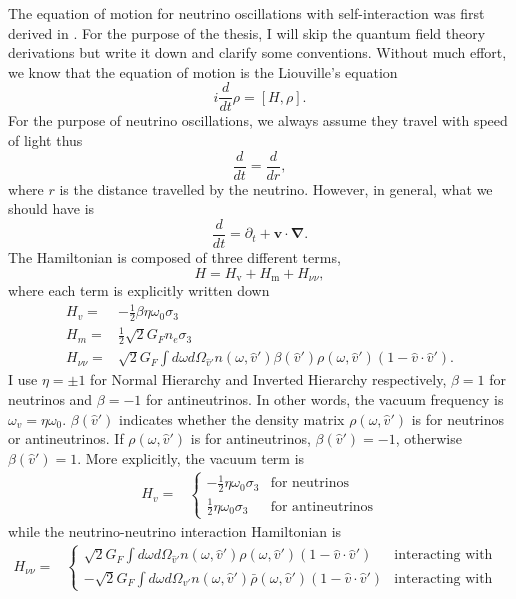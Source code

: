 The equation of motion for neutrino oscillations with self-interaction was first derived in \cite{Sigl1993}. For the purpose of the thesis, I will skip the quantum field theory derivations but write it down and clarify some conventions. Without much effort, we know that the equation of motion is the Liouville's equation
\begin{equation}
   i \frac{d}{dt}\rho = [H,\rho].
\end{equation}
For the purpose of neutrino oscillations, we always assume they travel with speed of light thus
\begin{equation}
   \frac{d}{dt} = \frac{d}{dr},
\end{equation}
where $r$ is the distance travelled by the neutrino. However, in general, what we should have is
\begin{equation}
   \frac{d}{dt} = \partial_t + \mathbf v\cdot \boldsymbol{\nabla}.
\end{equation}
The Hamiltonian is composed of three different terms,
\begin{equation}
   H = H_{\mathrm v} + H_{\mathrm m} + H_{\nu\nu},
\end{equation}
where each term is explicitly written down
\begin{align}
   H_v =& -\frac{1}{2}\beta\eta \omega_0 \sigma_3\\
   H_m =& \frac{1}{2} \sqrt{2}G_F n_e \sigma_3 \\
   H_{\nu\nu} =& \sqrt{2}G_F \int d\omega d\Omega_{\hat v'} n(\omega,\hat v')\beta(\hat v')\rho(\omega,\hat v') (1-\hat v \cdot \hat v').
\end{align}
I use $\eta=\pm 1$ for Normal Hierarchy and Inverted Hierarchy respectively, $\beta=1$ for neutrinos and $\beta=-1$ for antineutrinos. In other words, the vacuum frequency is $\omega_v = \eta \omega_0$. $\beta(\hat v')$ indicates whether the density matrix $\rho(\omega,\hat v')$ is for neutrinos or antineutrinos. If $\rho(\omega,\hat v')$ is for antineutrinos, $\beta(\hat v')=-1$, otherwise $\beta(\hat v')=1$. More explicitly, the vacuum term is
\begin{align*}
   H_v =& \begin{cases}
   -\frac{1}{2}\eta \omega_0 \sigma_3 & \text{for neutrinos}\\
   \frac{1}{2}\eta \omega_0 \sigma_3 & \text{for antineutrinos}
   \end{cases}
\end{align*}
while the neutrino-neutrino interaction Hamiltonian is
\begin{align*}
   H_{\nu\nu} =& \begin{cases}
   \sqrt{2}G_F \int d\omega d\Omega_{\hat v'} n(\omega,\hat v')\rho(\omega,\hat v') (1-\hat v \cdot \hat v') & \text{interacting with neutrinos} \\
   - \sqrt{2}G_F \int d\omega d\Omega_{\hat v'} n(\omega,\hat v')\bar\rho(\omega,\hat v') (1-\hat v \cdot \hat v') &  \text{interacting with antineutrinos}
   \end{cases}
\end{align*}
